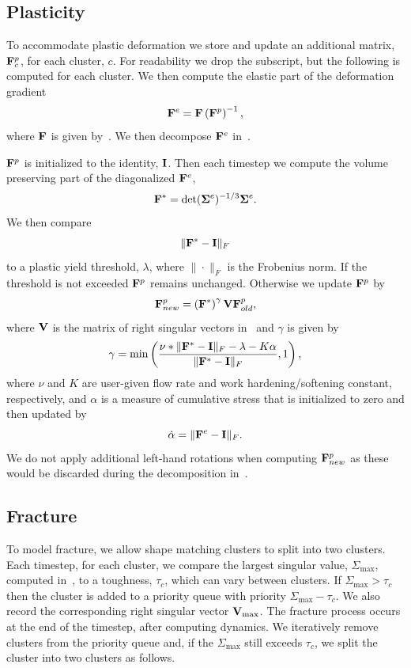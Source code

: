 \documentclass[review]{acmsiggraph}
\begin{document}
\subsection{Plasticity}
\label{sec:Plasticity}
To accommodate plastic deformation we store and update an additional matrix, $\mathit{\mathbf{F}}^p_c$, for each cluster, $c$.
For readability we drop the subscript, but the following is computed for each cluster.
We then compute the elastic part of the deformation gradient
\begin{equation}
\mathit{\mathbf{F}}^e = \mathit{\mathbf{F}} \left(\mathit{\mathbf{F}}^p\right)^{-1},
\end{equation}
where $\mathit{\mathbf{F}}$ is given by~.  We then decompose $\mathit{\mathbf{F}}^e$ in~.

$\mathit{\mathbf{F}}^p$ is initialized to the identity, $\mathit{\mathbf{I}}$.  Then each timestep we compute the volume preserving part 
of the diagonalized $\mathit{\mathbf{F}}^e$,
\begin{equation}
\mathit{\mathbf{F}}^* = \det(\mathit{\mathbf{\Sigma}}^e)^{-1/3}\mathit{\mathbf{\Sigma}}^e.
\end{equation}
We then compare
\begin{equation}
\|\mathit{\mathbf{F}}^* - \mathit{\mathbf{I}}\|_F
\end{equation}
to a plastic yield threshold, $\lambda$, where $\|\cdot\|_F$ is the Frobenius norm.  If the threshold
is not exceeded $\mathit{\mathbf{F}}^p$ remains unchanged.  Otherwise we update $\mathit{\mathbf{F}}^p$ by
\begin{equation}
\mathit{\mathbf{F}}^p_{new} = \left(\mathit{\mathbf{F}}^*\right)^\gamma\mathit{\mathbf{V}}\mathit{\mathbf{F}}^p_{old},
\end{equation}
where $\mathit{\mathbf{V}}$ is the matrix of right singular vectors in~ and $\gamma$ is given by
\begin{equation}
\gamma = \min\left(\frac{\nu * \|\mathit{\mathbf{F}}^* - \mathit{\mathbf{I}}\|_F - \lambda - K\alpha}{\|\mathit{\mathbf{F}}^* - \mathit{\mathbf{I}}\|_F},1\right),
\end{equation}
where $\nu$ and $K$ are user-given flow rate and work hardening/softening constant, respectively, 
and $\alpha$ is a measure of cumulative stress that is initialized to zero and then updated by
\begin{equation}
\dot{\alpha} = \|\mathit{\mathbf{F}}^e-\mathit{\mathbf{I}}\|_F.
\end{equation}
We do not apply additional left-hand rotations when computing $\mathit{\mathbf{F}}^p_{new}$ as these would be discarded during
the decomposition in~.


\subsection{Fracture}
\label{sec:Fracture}
To model fracture, we allow shape matching clusters to split into two clusters.  Each timestep, for each cluster,
we compare the largest singular value, $\Sigma_{\max}$, computed in~, to a toughness, $\tau_c$, which
can vary between clusters.  
If $\Sigma_{\max} > \tau_c$ then the cluster is added to a priority queue with priority $\Sigma_{\max} - \tau_c$.  We also
record the corresponding right singular vector $\mathit{\mathbf{V}}_{\max}$.  The fracture process occurs 
at the end of the timestep, after computing dynamics.  We iteratively remove
clusters from the priority queue and, if the $\Sigma_{\max}$ still exceeds $\tau_c$, we split the cluster into two clusters
as follows.
\end{document}
